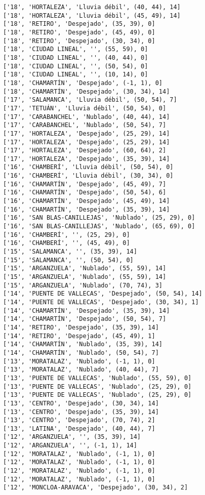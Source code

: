 \documentclass[11pt]{article}
\begin{document}
\begin{Verbatim}[commandchars=\\\{\}]
['18', 'HORTALEZA', 'Lluvia débil', (40, 44), 14]
['18', 'HORTALEZA', 'Lluvia débil', (45, 49), 14]
['18', 'RETIRO', 'Despejado', (35, 39), 0]
['18', 'RETIRO', 'Despejado', (45, 49), 0]
['18', 'RETIRO', 'Despejado', (30, 34), 0]
['18', 'CIUDAD LINEAL', '', (55, 59), 0]
['18', 'CIUDAD LINEAL', '', (40, 44), 0]
['18', 'CIUDAD LINEAL', '', (50, 54), 0]
['18', 'CIUDAD LINEAL', '', (10, 14), 0]
['18', 'CHAMARTÍN', 'Despejado', (-1, 1), 0]
['18', 'CHAMARTÍN', 'Despejado', (30, 34), 14]
['17', 'SALAMANCA', 'Lluvia débil', (50, 54), 7]
['17', 'TETUÁN', 'Lluvia débil', (50, 54), 0]
['17', 'CARABANCHEL', 'Nublado', (40, 44), 14]
['17', 'CARABANCHEL', 'Nublado', (50, 54), 7]
['17', 'HORTALEZA', 'Despejado', (25, 29), 14]
['17', 'HORTALEZA', 'Despejado', (25, 29), 14]
['17', 'HORTALEZA', 'Despejado', (60, 64), 2]
['17', 'HORTALEZA', 'Despejado', (35, 39), 14]
['16', 'CHAMBERÍ', 'Lluvia débil', (50, 54), 0]
['16', 'CHAMBERÍ', 'Lluvia débil', (30, 34), 0]
['16', 'CHAMARTÍN', 'Despejado', (45, 49), 7]
['16', 'CHAMARTÍN', 'Despejado', (50, 54), 6]
['16', 'CHAMARTÍN', 'Despejado', (45, 49), 14]
['16', 'CHAMARTÍN', 'Despejado', (35, 39), 14]
['16', 'SAN BLAS-CANILLEJAS', 'Nublado', (25, 29), 0]
['16', 'SAN BLAS-CANILLEJAS', 'Nublado', (65, 69), 0]
['16', 'CHAMBERÍ', '', (25, 29), 0]
['16', 'CHAMBERÍ', '', (45, 49), 0]
['15', 'SALAMANCA', '', (35, 39), 14]
['15', 'SALAMANCA', '', (50, 54), 0]
['15', 'ARGANZUELA', 'Nublado', (55, 59), 14]
['15', 'ARGANZUELA', 'Nublado', (55, 59), 14]
['15', 'ARGANZUELA', 'Nublado', (70, 74), 3]
['14', 'PUENTE DE VALLECAS', 'Despejado', (50, 54), 14]
['14', 'PUENTE DE VALLECAS', 'Despejado', (30, 34), 1]
['14', 'CHAMARTÍN', 'Despejado', (35, 39), 14]
['14', 'CHAMARTÍN', 'Despejado', (50, 54), 7]
['14', 'RETIRO', 'Despejado', (35, 39), 14]
['14', 'RETIRO', 'Despejado', (45, 49), 1]
['14', 'CHAMARTÍN', 'Nublado', (35, 39), 14]
['14', 'CHAMARTÍN', 'Nublado', (50, 54), 7]
['13', 'MORATALAZ', 'Nublado', (-1, 1), 0]
['13', 'MORATALAZ', 'Nublado', (40, 44), 7]
['13', 'PUENTE DE VALLECAS', 'Nublado', (55, 59), 0]
['13', 'PUENTE DE VALLECAS', 'Nublado', (25, 29), 0]
['13', 'PUENTE DE VALLECAS', 'Nublado', (25, 29), 0]
['13', 'CENTRO', 'Despejado', (30, 34), 14]
['13', 'CENTRO', 'Despejado', (35, 39), 14]
['13', 'CENTRO', 'Despejado', (70, 74), 2]
['13', 'LATINA', 'Despejado', (40, 44), 7]
['12', 'ARGANZUELA', '', (35, 39), 14]
['12', 'ARGANZUELA', '', (-1, 1), 14]
['12', 'MORATALAZ', 'Nublado', (-1, 1), 0]
['12', 'MORATALAZ', 'Nublado', (-1, 1), 0]
['12', 'MORATALAZ', 'Nublado', (-1, 1), 0]
['12', 'MORATALAZ', 'Nublado', (-1, 1), 0]
['12', 'MONCLOA-ARAVACA', 'Despejado', (30, 34), 2]

\end{Verbatim}
\end{document}
